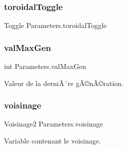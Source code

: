 \subsubsection{\texorpdfstring{toroidal\+Toggle}{toroidalToggle}}
{\footnotesize\ttfamily Toggle Parameters.\+toroidal\+Toggle}

\mbox{\label{class_parameters_a169d89f0e1954fe0dd8a588db68bc5d3}} 
\subsubsection{\texorpdfstring{val\+Max\+Gen}{valMaxGen}}
{\footnotesize\ttfamily int Parameters.\+val\+Max\+Gen\hspace{0.3cm}{\ttfamily [private]}}



Valeur de la derniÃ¨re gÃ©nÃ©ration. 

\mbox{\label{class_parameters_ad6693ced27cf9d3ebe6d35400ee1bdd5}} 
\subsubsection{\texorpdfstring{voisinage}{voisinage}}
{\footnotesize\ttfamily Voisinage2 Parameters.\+voisinage\hspace{0.3cm}{\ttfamily [private]}}



Variable contenant le voisinage. 

